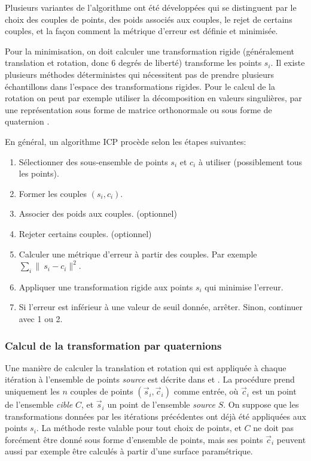 \documentclass[a4paper,10pt]{scrreprt}
\begin{document}
Plusieurs variantes de l'algorithme ont été développées qui se distinguent par le choix des couples de points, des poids associés aux couples, le rejet de certains couples, et la façon comment la métrique d'erreur est définie et minimisée. \cite{Rusi2001}

Pour la minimisation, on doit calculer une transformation rigide (généralement translation et rotation, donc 6 degrés de liberté) transforme les points $s_i$. Il existe plusieurs méthodes déterministes qui nécessitent pas de prendre plusieurs échantillons dans l'espace des transformations rigides. Pour le calcul de la rotation on peut par exemple utiliser la décomposition en valeurs singulières, par une représentation sous forme de matrice orthonormale ou sous forme de quaternion \cite{Horn1986}.

En général, un algorithme ICP procède selon les étapes suivantes:
\begin{enumerate}
	\item Sélectionner des sous-ensemble de points ${s_i}$ et ${c_i}$ à utiliser (possiblement tous les points).
	\item Former les couples $(s_i, c_i)$.
	\item Associer des poids aux couples. (optionnel)
	\item Rejeter certains couples. (optionnel)
	\item Calculer une métrique d'erreur à partir des couples. Par exemple $\sum_{i} \|\ s_i - c_i \|^2$.
	\item Appliquer une transformation rigide aux points ${s_i}$ qui minimise l'erreur.
	\item Si l'erreur est inférieur à une valeur de seuil donnée, arrêter. Sinon, continuer avec 1 ou 2. 
\end{enumerate}


\subsubsection{Calcul de la transformation par quaternions}
Une manière de calculer la translation et rotation qui est appliquée à chaque itération à l'ensemble de points \emph{source} est décrite dans \cite{Besl1992} et \cite{Horn1986}. La procédure prend uniquement les $n$ couples de points $(\vec{s}_i, \vec{c}_i)$ comme entrée, où $\vec{c}_i$ est un point de l'ensemble \emph{cible} $C$, et $\vec{s}_i$ un point de l'ensemble \emph{source} $S$. On suppose que les transformations données par les itérations précédentes ont déjà été appliquées aux points $s_i$. La méthode reste valable pour tout choix de points, et $C$ ne doit pas forcément être donné sous forme d'ensemble de points, mais ses points $\vec{c}_i$ peuvent aussi par exemple être calculés à partir d'une surface paramétrique.
\end{document}

